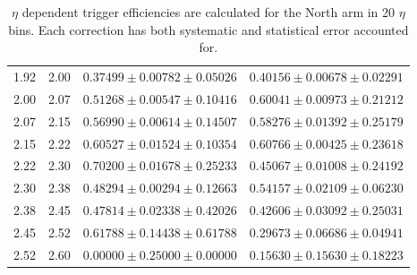 \begin{table}
\begin{tabular}{cccc}
    1.92 & 2.00 & $0.37499 \pm 0.00782 \pm 0.05026$ & $0.40156 \pm 0.00678 \pm 0.02291$ \\
    2.00 & 2.07 & $0.51268 \pm 0.00547 \pm 0.10416$ & $0.60041 \pm 0.00973 \pm 0.21212$ \\
    2.07 & 2.15 & $0.56990 \pm 0.00614 \pm 0.14507$ & $0.58276 \pm 0.01392 \pm 0.25179$ \\
    2.15 & 2.22 & $0.60527 \pm 0.01524 \pm 0.10354$ & $0.60766 \pm 0.00425 \pm 0.23618$ \\
    2.22 & 2.30 & $0.70200 \pm 0.01678 \pm 0.25233$ & $0.45067 \pm 0.01008 \pm 0.24192$ \\
    2.30 & 2.38 & $0.48294 \pm 0.00294 \pm 0.12663$ & $0.54157 \pm 0.02109 \pm 0.06230$ \\
    2.38 & 2.45 & $0.47814 \pm 0.02338 \pm 0.42026$ & $0.42606 \pm 0.03092 \pm 0.25031$ \\
    2.45 & 2.52 & $0.61788 \pm 0.14438 \pm 0.61788$ & $0.29673 \pm 0.06686 \pm 0.04941$ \\
    2.52 & 2.60 & $0.00000 \pm 0.25000 \pm 0.00000$ & $0.15630 \pm 0.15630 \pm 0.18223$ \\
    \bottomrule
  \end{tabular}
  \caption{
    $\eta$ dependent trigger efficiencies are calculated for the North arm in 20
    $\eta$ bins. Each correction has both systematic and statistical error
    accounted for.
  }
  \label{tab:rapidity_corrections_north}
\end{table}


